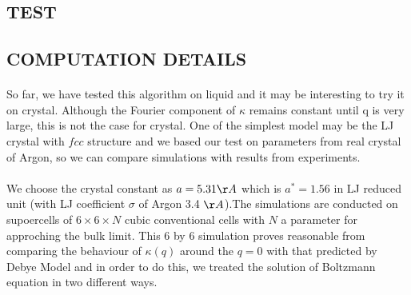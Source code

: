 \documentclass[twocolumn]{article}
\author{}
\begin{document}
\setcounter{section}{2}
\begin{center}
\section{TEST}
\end{center}
\subsection*{COMPUTATION DETAILS}
\paragraph*{}
So far, we have tested this algorithm on liquid and it may be interesting to try it on crystal. Although the Fourier component of $\kappa$ remains constant until q is very large, this is not the case for crystal. One of the simplest model may be the LJ crystal with $fcc$ structure and we based our test on parameters from real crystal of Argon, so we can compare simulations with results from experiments.
\paragraph*{}
We choose the crystal constant as $a=5.31\AA$ which is $a^*=1.56$ in LJ reduced unit (with LJ coefficient $\sigma$ of Argon 3.4 $\AA$).The simulations are conducted on supoercells of $6\times6\times{N}$ cubic conventional cells with $N$ a parameter for approching the bulk limit. This 6 by 6 simulation proves reasonable from comparing the behaviour of $\kappa(q)$ around the $q=0$ with that predicted by Debye Model and in order to do this, we treated the solution of Boltzmann equation in two different ways.
\end{document}
